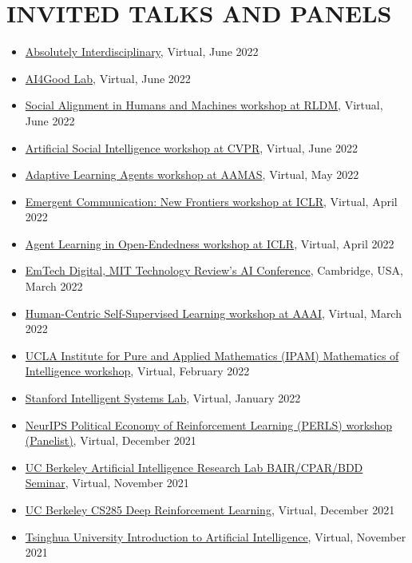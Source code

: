 \documentclass[paper=letter,fontsize=11pt]{scrartcl} %
\newcommand{\NewPart}[2]{\section*{\uppercase{#1} #2}}
\newcommand{\TalkEntry}[4]{
        \noindent \href{#4}{#1}, #2, #3 }
\begin{document}
\NewPart{Invited Talks and Panels}{}
\begin{itemize}
\item\TalkEntry{Absolutely Interdisciplinary}{Virtual}{June 2022}{https://absolutelyinterdisciplinary.com/speakers-2022}
\item\TalkEntry{AI4Good Lab}{Virtual}{June 2022}{https://www.ai4goodlab.com/}
\item\TalkEntry{Social Alignment in Humans and Machines workshop at RLDM}{Virtual}{June 2022}{https://sites.google.com/corp/mila.quebec/soc-rldm/home}
\item\TalkEntry{Artificial Social Intelligence workshop at CVPR}{Virtual}{June 2022}{https://sites.google.com/corp/berkeley.edu/artificial-social-intelligence}
\item\TalkEntry{Adaptive Learning Agents workshop at AAMAS}{Virtual}{May 2022}{https://www.youtube.com/watch?v=0fyCDafLrfU}
\item\TalkEntry{Emergent Communication: New Frontiers workshop at ICLR}{Virtual}{April 2022}{https://sites.google.com/corp/view/emecom2022}
\item\TalkEntry{Agent Learning in Open-Endedness workshop at ICLR}{Virtual}{April 2022}{https://sites.google.com/corp/view/aloe2022/schedule}
\item\TalkEntry{EmTech Digital, MIT Technology Review's AI Conference}{Cambridge, USA}{March 2022}{https://event.technologyreview.com/emtech-digital-2022/speakers}
\item\TalkEntry{Human-Centric Self-Supervised Learning workshop at AAAI}{Virtual}{March 2022}{https://hcssl.github.io/AAAI-22/pages/speakers.html}
\item\TalkEntry{UCLA Institute for Pure and Applied Mathematics (IPAM) Mathematics of Intelligence workshop}{Virtual}{February 2022}{https://www.youtube.com/watch?v=rjLT0NkCp9I}
\item\TalkEntry{Stanford Intelligent Systems Lab}{Virtual}{January 2022}{}
\item\TalkEntry{NeurIPS Political Economy of Reinforcement Learning (PERLS) workshop (Panelist)}{Virtual}{December 2021}{https://neurips.cc/virtual/2021/workshop/21864}
\item\TalkEntry{UC Berkeley Artificial Intelligence Research Lab BAIR/CPAR/BDD Seminar}{Virtual}{November 2021}{}
\item\TalkEntry{UC Berkeley CS285 Deep Reinforcement Learning}{Virtual}{December 2021}{}
\item\TalkEntry{Tsinghua University Introduction to Artificial Intelligence}{Virtual}{November 2021}{}

\end{itemize}
\end{document}
